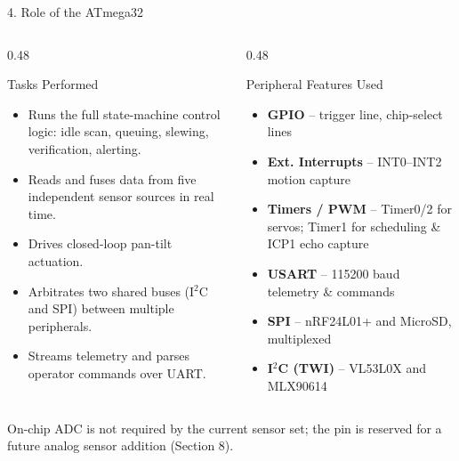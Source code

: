 \documentclass[aspectratio=169, 10pt]{beamer}
\begin{document}
\begin{frame}{4. Role of the ATmega32}
    \begin{columns}[T]
        \begin{column}{0.48\textwidth}
            \begin{block}{Tasks Performed}
                \small
                \begin{itemize}
                    \item Runs the full state-machine control logic: idle scan, queuing, slewing, verification, alerting.
                    \item Reads and fuses data from five independent sensor sources in real time.
                    \item Drives closed-loop pan-tilt actuation.
                    \item Arbitrates two shared buses (I$^2$C and SPI) between multiple peripherals.
                    \item Streams telemetry and parses operator commands over UART.
                \end{itemize}
            \end{block}
        \end{column}
        \begin{column}{0.48\textwidth}
            \begin{block}{Peripheral Features Used}
                \small
                \begin{itemize}
                    \item \textbf{GPIO} -- trigger line, chip-select lines
                    \item \textbf{Ext. Interrupts} -- INT0--INT2 motion capture
                    \item \textbf{Timers / PWM} -- Timer0/2 for servos; Timer1 for scheduling \& ICP1 echo capture
                    \item \textbf{USART} -- 115200 baud telemetry \& commands
                    \item \textbf{SPI} -- nRF24L01+ and MicroSD, multiplexed
                    \item \textbf{I$^2$C (TWI)} -- VL53L0X and MLX90614
                \end{itemize}
            \end{block}
        \end{column}
    \end{columns}
    \vspace{0.15cm}
    \footnotesize\color{TextDim} On-chip ADC is not required by the current sensor set; the pin is reserved for a future analog sensor addition (Section 8).
\end{frame}
\end{document}
